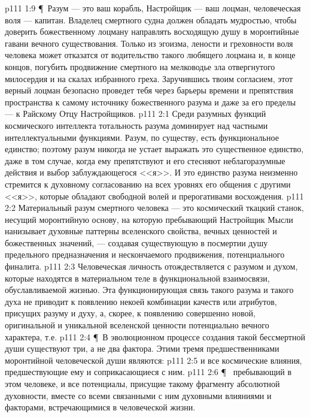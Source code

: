 \vs p111 1:9 \P\ Разум --- это ваш корабль, Настройщик --- ваш лоцман, человеческая воля --- капитан. Владелец смертного судна должен обладать мудростью, чтобы доверить божественному лоцману направлять восходящую душу в моронтийные гавани вечного существования. Только из эгоизма, лености и греховности воля человека может отказатся от водительство такого любящего лоцмана и, в конце концов, погубить продвижение смертного на мелководье зла отвергнутого милосердия и на скалах избранного греха. Заручившись твоим согласием, этот верный лоцман безопасно проведет тебя через барьеры времени и препятствия пространства к самому источнику божественного разума и даже за его пределы --- к Райскому Отцу Настройщиков.
\vs p111 2:1 Среди разумных функций космического интеллекта тотальность разума доминирует над частными интеллектуальными функциями. Разум, по существу, есть функциональное единство; поэтому разум никогда не устает выражать это существенное единство, даже в том случае, когда ему препятствуют и его стесняют неблагоразумные действия и выбор заблуждающегося <<я>>. И это единство разума неизменно стремится к духовному согласованию на всех уровнях его общения с другими <<я>>, которые обладают свободной волей и прерогативами восхождения.
\vs p111 2:2 Материальный разум смертного человека --- это космический ткацкий станок, несущий моронтийную основу, на которую пребывающий Настройщик Мысли нанизывает духовные паттерны вселенского свойства, вечных ценностей и божественных значений, --- создавая существующую в посмертии душу предельного предназначения и нескончаемого продвижения, потенциального финалита.
\vs p111 2:3 Человеческая личность отождествляется с разумом и духом, которые находятся в материальном теле в функциональной взаимосвязи, обуславливаемой жизнью. Эта функционирующая связь такого разума и такого духа не приводит к появлению некоей комбинации качеств или атрибутов, присущих разуму и духу, а, скорее, к появлению совершенно новой, оригинальной и уникальной вселенской ценности потенциально вечного характера, т.е. 
\vs p111 2:4 \P\ В эволюционном процессе создания такой бессмертной души существуют три, а не два фактора. Этими тремя предшественниками моронтийной человеческой души являются:
\vs p111 2:5 \bibnobreakspace {} и все космические влияния, предшествующие ему и соприкасающиеся с ним.
\vs p111 2:6 \P\ \bibnobreakspace {} пребывающий в этом человеке, и все потенциалы, присущие такому фрагменту абсолютной духовности, вместе со всеми связанными с ним духовными влияниями и факторами, встречающимися в человеческой жизни.
